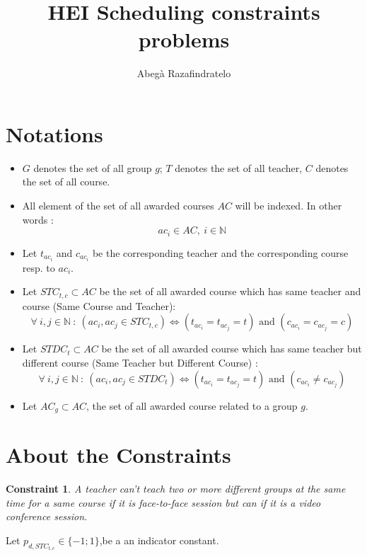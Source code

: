 \documentclass[12pt,a4paper]{article}
\author{Abegà Razafindratelo}
\title{HEI Scheduling constraints problems}
\newtheorem{theorem}{Constraint}
\begin{document}
\maketitle
\section*{Notations}
\begin{itemize}
	
	\item $G$ denotes the set of all group $g$; $T$ denotes the set of all teacher, $C$ denotes the set of all course.
	
	\item All element of the set of all awarded courses $AC$ will be indexed. In other words :
	$$
	 ac_{i} \in AC,\ i \in \mathbb{N}
	$$
	
	\item Let $t_{ac_{i}}$ and $c_{ac_{i}}$ be the corresponding teacher and the corresponding course resp. to  $ac_{i}$.
	
	\item Let $STC_{t,c} \subset AC$  be the set of all awarded course which has same teacher and course (Same Course and Teacher):
	$$
	\forall \ i, j \in \mathbb{N} \ : \ \left(ac_{i}, ac_{j} \in  STC_{t,c}\right)                            \Longleftrightarrow \left(t_{ac_{i}} = t_{ac_{j}}  = t \right) \text{ and } 
	\left(c_{ac_{i}} = c_{ac_{j}}  =  c \right)
	$$ 
	
	\item Let $STDC_{t} \subset AC$ be the set of all awarded course which has same teacher but different course (Same Teacher but Different Course) :
	$$
	\forall \ i, j \in \mathbb{N} \ : \ \left(ac_{i}, ac_{j} \in  STDC_{t}\right)                            \Longleftrightarrow \left(t_{ac_{i}} = t_{ac_{j}}  = t \right) \text{ and } 
	\left(c_{ac_{i}} \neq c_{ac_{j}} \right)
	$$ 
	
	\item Let $AC_{g} \subset AC$, the set of all awarded course related to a group $g$.

\end{itemize}
\newpage
\section*{About the Constraints}

\begin{theorem}
A teacher can't teach two or more different groups at the same time for a same course if it is face-to-face session but can if it is a video conference session.
\end{theorem}
Let $p_{d, STC_{t,c}} \in \lbrace -1;1 \rbrace  $,be a an indicator constant.
	
\end{document}
